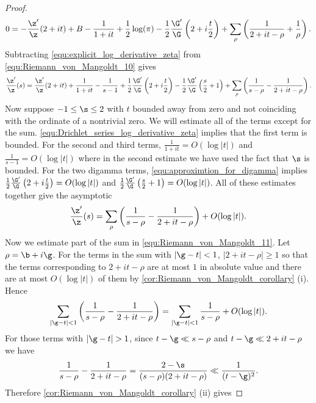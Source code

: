 \begin{proof}
        \begin{equation}\label{equ:Riemann_von_Mangoldt_10}
          0 = -\frac{\z'}{\z}(2+it)+B-\frac{1}{1+it}+\frac{1}{2}\log(\pi)-\frac{1}{2}\frac{\G'}{\G}\left(2+i\frac{t}{2}\right)+\sum_{\rho}\left(\frac{1}{2+it-\rho}+\frac{1}{\rho}\right).
        \end{equation}
        Subtracting \cref{equ:explicit_log_derivative_zeta} from \cref{equ:Riemann_von_Mangoldt_10} gives
        \[
          \frac{\z'}{\z}(s) = \frac{\z'}{\z}(2+it)+\frac{1}{1+it}-\frac{1}{s-1}+\frac{1}{2}\frac{\G'}{\G}\left(2+i\frac{t}{2}\right)-\frac{1}{2}\frac{\G'}{\G}\left(\frac{s}{2}+1\right)+\sum_{\rho}\left(\frac{1}{s-\rho}-\frac{1}{2+it-\rho}\right).
        \]
        Now suppose $-1 \le \s \le 2$ with $t$ bounded away from zero and not coinciding with the ordinate of a nontrivial zero. We will estimate all of the terms except for the sum. \cref{equ:Drichlet_series_log_derivative_zeta} implies that the first term is bounded. For the second and third terms, $\frac{1}{1+it} = O(\log|t|)$ and $\frac{1}{s-1} = O(\log|t|)$ where in the second estimate we have used the fact that $\s$ is bounded. For the two digamma terms, \cref{equ:approximtion_for_digamma} implies $\frac{1}{2}\frac{\G'}{\G}\left(2+i\frac{t}{2}\right) = O(\log|t|)$ and $\frac{1}{2}\frac{\G'}{\G}\left(\frac{s}{2}+1\right) = O(\log|t|)$. All of these estimates together give the asymptotic
        \begin{equation}\label{equ:Riemann_von_Mangoldt_11}
          \frac{\z'}{\z}(s) = \sum_{\rho}\left(\frac{1}{s-\rho}-\frac{1}{2+it-\rho}\right)+O(\log|t|).
        \end{equation}
        Now we estimate part of the sum in \cref{equ:Riemann_von_Mangoldt_11}. Let $\rho = \b+i\g$. For the terms in the sum with $|\g-t| < 1$, $|2+it-\rho| \ge 1$ so that the terms corresponding to $2+it-\rho$ are at most $1$ in absolute value and there are at most $O(\log|t|)$ of them by \cref{cor:Riemann_von_Mangoldt_corollary} (i). Hence
        \begin{equation}\label{equ:Riemann_von_Mangoldt_12}
          \sum_{|\g-t| < 1}\left(\frac{1}{s-\rho}-\frac{1}{2+it-\rho}\right) = \sum_{|\g-t| < 1}\frac{1}{s-\rho}+O(\log|t|).
        \end{equation}
        For those terms with $|\g-t| > 1$, since $t-\g \ll s-\rho$ and $t-\g \ll 2+it-\rho$ we have
        \[
          \frac{1}{s-\rho}-\frac{1}{2+it-\rho} = \frac{2-\s}{(s-\rho)(2+it-\rho)} \ll \frac{1}{(t-\g)^{2}}.
        \]
        Therefore \cref{cor:Riemann_von_Mangoldt_corollary} (ii) gives

\end{proof}
